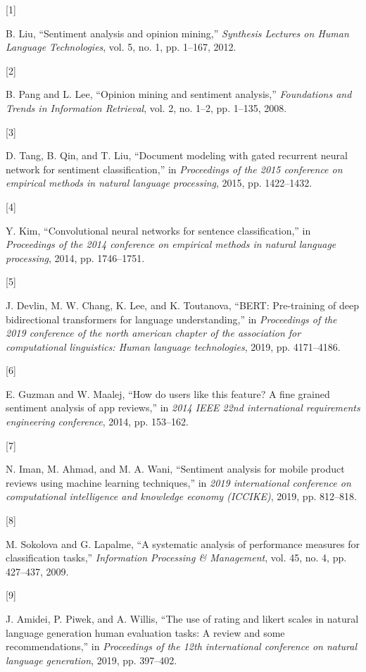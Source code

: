 \documentclass[
]{article}
\newlength{\cslhangindent}
\newlength{\csllabelwidth}
\newenvironment{CSLReferences}[2] %
 {\begin{list}{}{%
  \setlength{\itemindent}{0pt}
  \setlength{\leftmargin}{0pt}
  \setlength{\parsep}{0pt}
  \ifodd #1
   \setlength{\leftmargin}{\cslhangindent}
   \setlength{\itemindent}{-1\cslhangindent}
  \fi
  \setlength{\itemsep}{#2\baselineskip}}}
 {\end{list}}
\newcommand{\CSLLeftMargin}[1]{\parbox[t]{\csllabelwidth}{\strut#1\strut}}
\newcommand{\CSLRightInline}[1]{\parbox[t]{\linewidth - \csllabelwidth}{\strut#1\strut}}
\begin{document}
\label{refs}
\begin{CSLReferences}{0}{0}
\CSLLeftMargin{{[}1{]} }%
\CSLRightInline{B. Liu, {``Sentiment analysis and opinion mining,''}
\emph{Synthesis Lectures on Human Language Technologies}, vol. 5, no. 1,
pp. 1--167, 2012.}

\CSLLeftMargin{{[}2{]} }%
\CSLRightInline{B. Pang and L. Lee, {``Opinion mining and sentiment
analysis,''} \emph{Foundations and Trends in Information Retrieval},
vol. 2, no. 1--2, pp. 1--135, 2008.}

\CSLLeftMargin{{[}3{]} }%
\CSLRightInline{D. Tang, B. Qin, and T. Liu, {``Document modeling with
gated recurrent neural network for sentiment classification,''} in
\emph{Proceedings of the 2015 conference on empirical methods in natural
language processing}, 2015, pp. 1422--1432.}

\CSLLeftMargin{{[}4{]} }%
\CSLRightInline{Y. Kim, {``Convolutional neural networks for sentence
classification,''} in \emph{Proceedings of the 2014 conference on
empirical methods in natural language processing}, 2014, pp.
1746--1751.}

\CSLLeftMargin{{[}5{]} }%
\CSLRightInline{J. Devlin, M. W. Chang, K. Lee, and K. Toutanova,
{``BERT: Pre-training of deep bidirectional transformers for language
understanding,''} in \emph{Proceedings of the 2019 conference of the
north american chapter of the association for computational linguistics:
Human language technologies}, 2019, pp. 4171--4186.}

\CSLLeftMargin{{[}6{]} }%
\CSLRightInline{E. Guzman and W. Maalej, {``How do users like this
feature? A fine grained sentiment analysis of app reviews,''} in
\emph{2014 IEEE 22nd international requirements engineering conference},
2014, pp. 153--162.}

\CSLLeftMargin{{[}7{]} }%
\CSLRightInline{N. Iman, M. Ahmad, and M. A. Wani, {``Sentiment analysis
for mobile product reviews using machine learning techniques,''} in
\emph{2019 international conference on computational intelligence and
knowledge economy (ICCIKE)}, 2019, pp. 812--818.}

\CSLLeftMargin{{[}8{]} }%
\CSLRightInline{M. Sokolova and G. Lapalme, {``A systematic analysis of
performance measures for classification tasks,''} \emph{Information
Processing \& Management}, vol. 45, no. 4, pp. 427--437, 2009.}

\CSLLeftMargin{{[}9{]} }%
\CSLRightInline{J. Amidei, P. Piwek, and A. Willis, {``The use of rating
and likert scales in natural language generation human evaluation tasks:
A review and some recommendations,''} in \emph{Proceedings of the 12th
international conference on natural language generation}, 2019, pp.
397--402.}

\end{CSLReferences}
\end{document}
